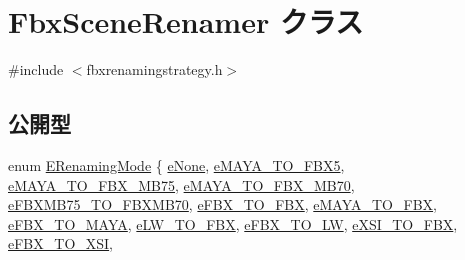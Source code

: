\hypertarget{class_fbx_scene_renamer}{}\section{Fbx\+Scene\+Renamer クラス}
\label{class_fbx_scene_renamer}


{\ttfamily \#include $<$fbxrenamingstrategy.\+h$>$}

\subsection*{公開型}
\begin{DoxyCompactItemize}
\item 
enum \hyperlink{class_fbx_scene_renamer_a9279ee1a645d6499b934adbc376f8678}{E\+Renaming\+Mode} \{ \newline
\hyperlink{class_fbx_scene_renamer_a9279ee1a645d6499b934adbc376f8678a6530ea605d82bb5be39517b65b47048e}{e\+None}, 
\hyperlink{class_fbx_scene_renamer_a9279ee1a645d6499b934adbc376f8678a2260cac4f4130491ec39fba62e14ae67}{e\+M\+A\+Y\+A\+\_\+\+T\+O\+\_\+\+F\+B\+X5}, 
\hyperlink{class_fbx_scene_renamer_a9279ee1a645d6499b934adbc376f8678a030c65de59d114a3765f95feb65ac211}{e\+M\+A\+Y\+A\+\_\+\+T\+O\+\_\+\+F\+B\+X\+\_\+\+M\+B75}, 
\hyperlink{class_fbx_scene_renamer_a9279ee1a645d6499b934adbc376f8678a2e7a4583ed692e1221fa3cd73422244d}{e\+M\+A\+Y\+A\+\_\+\+T\+O\+\_\+\+F\+B\+X\+\_\+\+M\+B70}, 
\newline
\hyperlink{class_fbx_scene_renamer_a9279ee1a645d6499b934adbc376f8678a24a5eaa8e3cf295fe398fd869647f6e0}{e\+F\+B\+X\+M\+B75\+\_\+\+T\+O\+\_\+\+F\+B\+X\+M\+B70}, 
\hyperlink{class_fbx_scene_renamer_a9279ee1a645d6499b934adbc376f8678a2c2f3cb14e2930a2385ccef05e3755ee}{e\+F\+B\+X\+\_\+\+T\+O\+\_\+\+F\+BX}, 
\hyperlink{class_fbx_scene_renamer_a9279ee1a645d6499b934adbc376f8678a4b39bec5838b0bce01e734b364e44d72}{e\+M\+A\+Y\+A\+\_\+\+T\+O\+\_\+\+F\+BX}, 
\hyperlink{class_fbx_scene_renamer_a9279ee1a645d6499b934adbc376f8678aae982f344936a216dcab27151b49d265}{e\+F\+B\+X\+\_\+\+T\+O\+\_\+\+M\+A\+YA}, 
\newline
\hyperlink{class_fbx_scene_renamer_a9279ee1a645d6499b934adbc376f8678ab3306834d174fa6efe260b4f87d6ecb1}{e\+L\+W\+\_\+\+T\+O\+\_\+\+F\+BX}, 
\hyperlink{class_fbx_scene_renamer_a9279ee1a645d6499b934adbc376f8678a56f129a668e8aea7a175935d85cd5eee}{e\+F\+B\+X\+\_\+\+T\+O\+\_\+\+LW}, 
\hyperlink{class_fbx_scene_renamer_a9279ee1a645d6499b934adbc376f8678a94d60d4399774240c2fa36b2176edbea}{e\+X\+S\+I\+\_\+\+T\+O\+\_\+\+F\+BX}, 
\hyperlink{class_fbx_scene_renamer_a9279ee1a645d6499b934adbc376f8678a4a0f4f0ca58029766c5c307ccca0f9c5}{e\+F\+B\+X\+\_\+\+T\+O\+\_\+\+X\+SI}, 

\end{DoxyCompactItemize}
